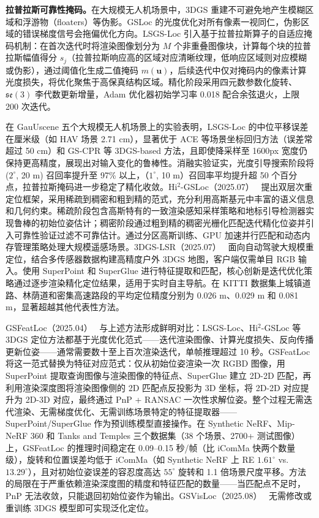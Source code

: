 \textbf{拉普拉斯可靠性掩码。}在大规模无人机场景中，3DGS 重建不可避免地产生模糊区域和浮游物（floaters）等伪影。GSLoc 的光度优化对所有像素一视同仁，伪影区域的错误梯度信号会拖偏优化方向。LSGS-Loc 引入基于拉普拉斯算子的自适应掩码机制：在首次迭代时将渲染图像划分为 $M$ 个非重叠图像块，计算每个块的拉普拉斯幅值得分 $s_j$（拉普拉斯响应高的区域对应清晰纹理，低响应区域则对应模糊或伪影），通过阈值化生成二值掩码 $m(\mathbf{u})$，后续迭代中仅对掩码内的像素计算光度损失，将优化聚焦于高保真结构区域。精化阶段采用四元数参数化旋转、$\mathfrak{se}(3)$ 李代数更新增量，Adam 优化器初始学习率 0.018 配合余弦退火，上限 200 次迭代。

在 GauUscene 五个大规模无人机场景上的实验表明，LSGS-Loc 的中位平移误差在厘米级（如 HAV 场景 2.71 cm），显著优于 ACE 等场景坐标回归方法（误差常超过 50 cm）和 GS-CPR 等 3DGS-based 方法，且即使降采样至 1600px 宽度仍保持更高精度，展现出对输入变化的鲁棒性。消融实验证实，光度引导搜索阶段将 ($2^\circ$, 20 m) 召回率提升至 97\% 以上，（$1^\circ$, 10 m）召回率平均提升超 50 个百分点，拉普拉斯掩码进一步稳定了精化收敛。Hi$^2$-GSLoc（2025.07）~\cite{2507_15683} 提出双层次重定位框架，采用稀疏到稠密和粗到精的范式，充分利用高斯基元中丰富的语义信息和几何约束。稀疏阶段包含高斯特有的一致渲染感知采样策略和地标引导检测器实现鲁棒的初始位姿估计；稠密阶段通过粗到精的稠密光栅化匹配迭代精化位姿并引入可靠性验证过滤不可靠估计。通过分区高斯训练、GPU 加速并行匹配和动态内存管理策略处理大规模遥感场景。3DGS-LSR（2025.07）~\cite{2507_05661} 面向自动驾驶大规模重定位，结合多传感器数据构建高精度户外 3DGS 地图，客户端仅需单目 RGB 输入。使用 SuperPoint 和 SuperGlue 进行特征提取和匹配，核心创新是迭代优化策略通过逐步渲染精化定位结果，适用于实时自主导航。在 KITTI 数据集上城镇道路、林荫道和密集高速路段的平均定位精度分别为 0.026 m、0.029 m 和 0.081 m，显著超越其他代表性方法。

GSFeatLoc（2025.04）~\cite{2504_20379} 与上述方法形成鲜明对比：LSGS-Loc、Hi$^2$-GSLoc 等 3DGS 定位方法都基于光度优化范式——迭代渲染图像、计算光度损失、反向传播更新位姿——通常需要数十至上百次渲染迭代，单帧推理超过 10 秒。GSFeatLoc 将这一范式替换为特征对应范式：仅从初始位姿渲染一次 RGBD 图像，用 SuperPoint 提取查询图像与渲染图像的特征点、SuperGlue 建立 2D-2D 匹配，再利用渲染深度图将渲染图像侧的 2D 匹配点反投影为 3D 坐标，将 2D-2D 对应提升为 2D-3D 对应，最终通过 PnP + RANSAC 一次性求解位姿。整个过程无需迭代渲染、无需梯度优化、无需训练场景特定的特征提取器——SuperPoint/SuperGlue 作为预训练模型直接操作。在 Synthetic NeRF、Mip-NeRF 360 和 Tanks and Temples 三个数据集（38 个场景、2700+ 测试图像）上，GSFeatLoc 的推理时间稳定在 0.09--0.15 秒/帧（比 iComMa 快两个数量级），旋转和位置误差均低于 iComMa（如 Synthetic NeRF 上 RE $1.61^\circ$ vs.\ $13.29^\circ$），且对初始位姿误差的容忍度高达 $55^\circ$ 旋转和 1.1 倍场景尺度平移。方法的局限在于严重依赖渲染深度图的精度和特征匹配的数量——当匹配点不足时，PnP 无法收敛，只能退回初始位姿作为输出。GSVisLoc（2025.08）~\cite{2508_18242} 无需修改或重训练 3DGS 模型即可实现泛化定位。

